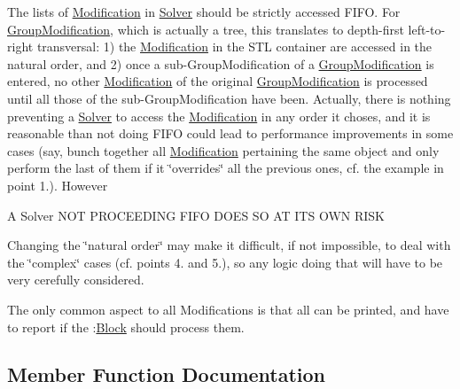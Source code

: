 \begin{DoxyEnumerate}
The lists of \mbox{\hyperlink{class_s_m_spp__di__unipi__it_1_1_modification}{Modification}} in \mbox{\hyperlink{class_s_m_spp__di__unipi__it_1_1_solver}{Solver}} should be strictly accessed F\+I\+FO. For \mbox{\hyperlink{class_s_m_spp__di__unipi__it_1_1_group_modification}{Group\+Modification}}, which is actually a tree, this translates to depth-\/first left-\/to-\/right transversal\+: 1) the \mbox{\hyperlink{class_s_m_spp__di__unipi__it_1_1_modification}{Modification}} in the S\+TL container are accessed in the natural order, and 2) once a sub-\/\+Group\+Modification of a \mbox{\hyperlink{class_s_m_spp__di__unipi__it_1_1_group_modification}{Group\+Modification}} is entered, no other \mbox{\hyperlink{class_s_m_spp__di__unipi__it_1_1_modification}{Modification}} of the original \mbox{\hyperlink{class_s_m_spp__di__unipi__it_1_1_group_modification}{Group\+Modification}} is processed until all those of the sub-\/\+Group\+Modification have been. Actually, there is nothing preventing a \mbox{\hyperlink{class_s_m_spp__di__unipi__it_1_1_solver}{Solver}} to access the \mbox{\hyperlink{class_s_m_spp__di__unipi__it_1_1_modification}{Modification}} in any order it choses, and it is reasonable than not doing F\+I\+FO could lead to performance improvements in some cases (say, bunch together all \mbox{\hyperlink{class_s_m_spp__di__unipi__it_1_1_modification}{Modification}} pertaining the same object and only perform the last of them if it \char`\"{}overrides\char`\"{} all the previous ones, cf. the example in point 1.). However \begin{DoxyVerb}A Solver NOT PROCEEDING FIFO DOES SO AT ITS OWN RISK
\end{DoxyVerb}


Changing the \char`\"{}natural order\char`\"{} may make it difficult, if not impossible, to deal with the \char`\"{}complex\char`\"{} cases (cf. points 4. and 5.), so any logic doing that will have to be very cerefully considered.
\end{DoxyEnumerate}

The only common aspect to all Modifications is that all can be printed, and have to report if the \+:\mbox{\hyperlink{class_s_m_spp__di__unipi__it_1_1_block}{Block}} should process them. 

\subsection{Member Function Documentation}
\mbox{\label{class_s_m_spp__di__unipi__it_1_1_modification_a22fe0cccfc755cfd89b240587d1f1cad}} 

